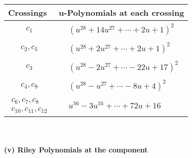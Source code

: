 \documentclass[1p]{elsarticle_modified}
\theoremstyle{definition}
\begin{document}
\begin{tabular}{m{50pt}|m{274pt}}
Crossings & \hspace{64pt}u-Polynomials at each crossing \\
\hline $$\begin{aligned}c_{1}\end{aligned}$$&$\begin{aligned}
&(u^{28}+14 u^{27}+\cdots+2 u+1)^{2}
\end{aligned}$\\
\hline $$\begin{aligned}c_{2},c_{5}\end{aligned}$$&$\begin{aligned}
&(u^{28}+2 u^{27}+\cdots+2 u+1)^{2}
\end{aligned}$\\
\hline $$\begin{aligned}c_{3}\end{aligned}$$&$\begin{aligned}
&(u^{28}-2 u^{27}+\cdots-22 u+17)^{2}
\end{aligned}$\\
\hline $$\begin{aligned}c_{4},c_{9}\end{aligned}$$&$\begin{aligned}
&(u^{28}- u^{27}+\cdots-8 u+4)^{2}
\end{aligned}$\\
\hline $$\begin{aligned}c_{6},c_{7},c_{8}\\c_{10},c_{11},c_{12}\end{aligned}$$&$\begin{aligned}
&u^{56}-3 u^{55}+\cdots+72 u+16
\end{aligned}$\\
\hline
\end{tabular}\\~\\
\newpage\renewcommand{\arraystretch}{1}
\flushleft \textbf{(v) Riley Polynomials at the component}\newline \\
\end{document}

